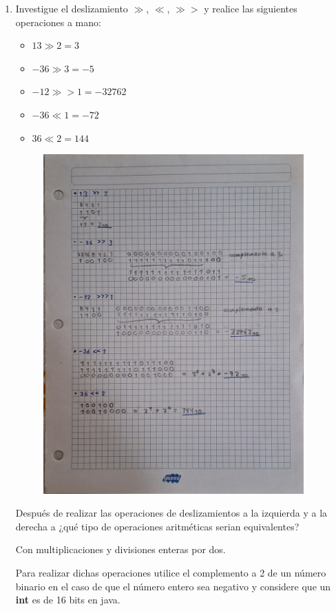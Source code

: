 \documentclass[12pt]{article}
\begin{document}
\begin{enumerate}[leftmargin=*]
        \newpage
        \item Investigue el deslizamiento $\gg$, $\ll$, $\gg>$ y realice las siguientes operaciones a mano:
        \begin{itemize}[leftmargin=*]
            \item $13 \gg 2 = 3$
            \item $-36 \gg 3 = -5$
            \item $-12 \gg> 1 = -32762$
            \item $-36 \ll 1 = -72$ 
            \item $36 \ll 2 = 144$
        \end{itemize}
        \begin{figure}[ht]
            \includegraphics[width = 10cm, center]{E3.jpg} 
        \end{figure}
        \newpage

        Después de realizar las operaciones de deslizamientos a la izquierda y a la derecha a ¿qué tipo de operaciones aritméticas serian equivalentes?

        Con multiplicaciones y divisiones enteras por dos.

        Para realizar dichas operaciones utilice el complemento a 2 de un número binario en el caso de que el número entero sea negativo y considere que un \textbf{int} es de 16 bits en java.


\end{enumerate}
\end{document}
